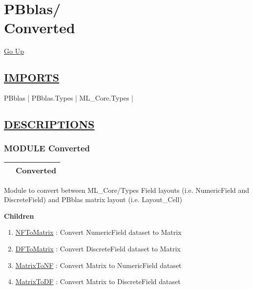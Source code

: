 \chapter*{\color{headfile}
{\large PBblas\slash\hspace{0pt}}
 \\
Converted
}
\hypertarget{ecldoc:toc:PBblas.Converted}{}
\hyperlink{ecldoc:toc:root/PBblas}{Go Up}

\section*{\underline{\textsf{IMPORTS}}}
\begin{doublespace}
{\large
PBblas |
PBblas.Types |
ML\_Core.Types |
}
\end{doublespace}

\section*{\underline{\textsf{DESCRIPTIONS}}}
\subsection*{\textsf{\colorbox{headtoc}{\color{white} MODULE}
Converted}}

\hypertarget{ecldoc:PBblas.Converted}{}

{\renewcommand{\arraystretch}{1.5}
\begin{tabularx}{\textwidth}{|>{\raggedright\arraybackslash}l|X|}
\hline
\hspace{0pt}\mytexttt{\color{red} } & \textbf{Converted} \\
\hline
\end{tabularx}
}

\par





Module to convert between ML\_Core/Types Field layouts (i.e. NumericField and DiscreteField) and PBblas matrix layout (i.e. Layout\_Cell)







\textbf{Children}
\begin{enumerate}
\item \hyperlink{ecldoc:pbblas.converted.nftomatrix}{NFToMatrix}
: Convert NumericField dataset to Matrix
\item \hyperlink{ecldoc:pbblas.converted.dftomatrix}{DFToMatrix}
: Convert DiscreteField dataset to Matrix
\item \hyperlink{ecldoc:pbblas.converted.matrixtonf}{MatrixToNF}
: Convert Matrix to NumericField dataset
\item \hyperlink{ecldoc:pbblas.converted.matrixtodf}{MatrixToDF}
: Convert Matrix to DiscreteField dataset
\end{enumerate}

